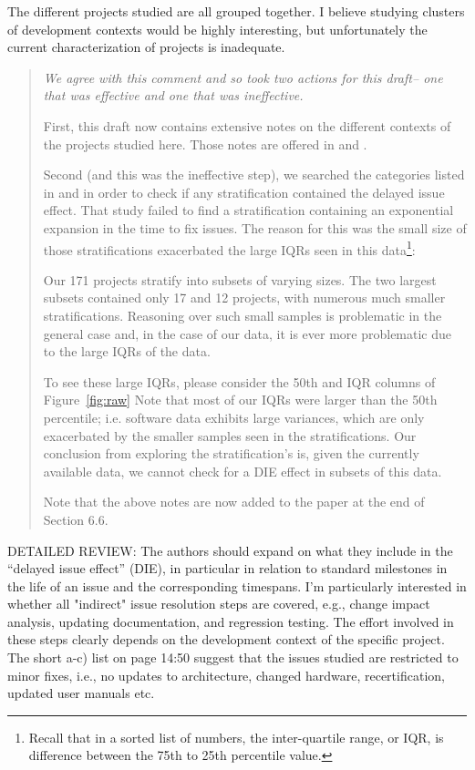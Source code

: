 The different projects studied are all grouped together. I
believe studying clusters of development contexts would be
highly interesting, but unfortunately the current
characterization of projects is inadequate.  

\begin{quote}{\em  We agree with this comment and so took two actions for this draft-- one that was effective and one that was ineffective. 

First, this draft now contains extensive notes on the different contexts of the
projects studied here. Those notes are offered in  and .

Second (and this was the ineffective step), we  searched the categories   listed in  and 
in order to check if any stratification contained the delayed issue effect. 
That study   failed to find a stratification
containing an exponential expansion in the time to fix issues. The reason for this was  the small size
of those stratifications  exacerbated the large IQRs seen in this data\footnote{Recall that in a sorted list of numbers,
the inter-quartile range, or IQR, is difference between the 
  75th to 25th percentile value.}:
\bi
\item
Our 171 projects   stratify into subsets of varying sizes. 
The two largest subsets contained only 17 and 12 projects, with numerous much smaller stratifications.
Reasoning over such small samples
is problematic in the general case and, in the case of our data, it is ever more problematic due to
the large IQRs of the data.
\item
To see these large IQRs,  please consider the 50th and IQR columns of Figure~\ref{fig:raw} Note that most of our IQRs were larger than the 50th percentile; i.e. software
data exhibits large variances, which are only exacerbated by the smaller samples seen in the stratifications.
\ei
Our conclusion from exploring the stratification's is, given the currently available data, we cannot check
for a DIE effect in subsets of this data.

Note that the above notes are now added to the paper at the end of Section 6.6.
 }\end{quote}



DETAILED REVIEW: The authors should expand on what they
include in the ``delayed issue effect'' (DIE), in particular
in relation to standard milestones in the life of an issue
and the corresponding timespans.  I'm particularly
interested in whether all "indirect" issue resolution steps
are covered, e.g., change impact analysis, updating
documentation, and regression testing. The effort involved
in these steps clearly depends on the development context of
the specific project. The short a-c) list on page 14:50
suggest that the issues studied are restricted to minor
fixes, i.e., no updates to architecture, changed hardware,
recertification, updated user manuals etc.

